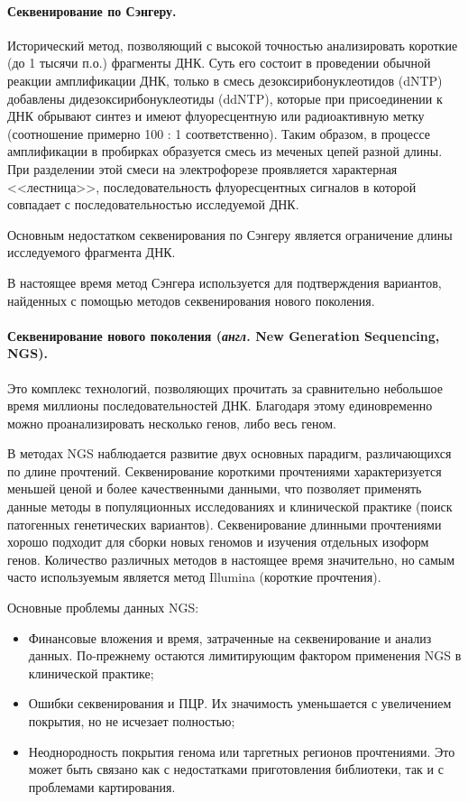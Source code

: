 \documentclass[a4paper,12pt]{article}
\begin{document}
\paragraph{Секвенирование по Сэнгеру.}
Исторический метод, позволяющий с высокой точностью анализировать короткие (до 1 тысячи п.о.) фрагменты ДНК\cite{Sanger_1977}.
Суть его состоит в проведении обычной реакции амплификации ДНК, только в смесь дезоксирибонуклеотидов (dNTP) добавлены дидезоксирибонуклеотиды (ddNTP), которые при присоединении к ДНК обрывают синтез и имеют флуоресцентную или радиоактивную метку (соотношение примерно 100 : 1 соответственно).
Таким образом, в процессе амплификации в пробирках образуется смесь из меченых цепей разной длины.
При разделении этой смеси на электрофорезе проявляется характерная <<лестница>>, последовательность флуоресцентных сигналов в которой совпадает с последовательностью исследуемой ДНК.

Основным недостатком секвенирования по Сэнгеру является ограничение длины исследуемого фрагмента ДНК.

В настоящее время метод Сэнгера используется для подтверждения вариантов, найденных с помощью методов секвенирования нового поколения.

\paragraph{Секвенирование нового поколения (\textit{англ.} New Generation Sequencing, NGS).}
Это комплекс технологий, позволяющих прочитать за сравнительно небольшое время миллионы последовательностей ДНК.
Благодаря этому единовременно можно проанализировать несколько генов, либо весь геном.

В методах NGS наблюдается развитие двух основных парадигм, различающихся по длине прочтений.
Секвенирование короткими прочтениями характеризуется меньшей ценой и более качественными данными, что позволяет применять данные методы в популяционных исследованиях и клинической практике (поиск патогенных генетических вариантов).
Секвенирование длинными прочтениями хорошо подходит для сборки новых геномов и изучения отдельных изоформ генов\cite{Goodwin_2016}.
Количество различных методов в настоящее время значительно, но самым часто используемым является метод Illumina (короткие прочтения).

Основные проблемы данных NGS:

\begin{itemize}
\item Финансовые вложения и время, затраченные на секвенирование и анализ данных.
По-прежнему остаются лимитирующим фактором применения NGS в клинической практике;
\item Ошибки секвенирования и ПЦР.
Их значимость уменьшается с увеличением покрытия, но не исчезает полностью;
\item Неоднородность покрытия генома или таргетных регионов прочтениями.
Это может быть связано как с недостатками приготовления библиотеки, так и с проблемами картирования.
\end{itemize}
\end{document}
